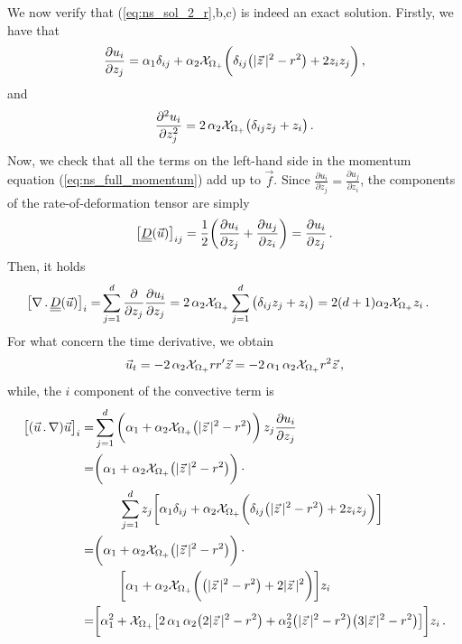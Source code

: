 We now verify that (\ref{eq:ns_sol_2_r},b,c) is indeed an exact solution.
Firstly, we have that
\begin{equation*}
\frac{\partial u_i}{\partial z_j} = \alpha_1 \delta_{ij}
+ \alpha_2\mathrm{\mathcal{X}}_{\Omega_+}\bigg(\delta_{ij}\big(|\vec z\,|^2-r^2\big)
+ 2z_iz_j\bigg)\,,
\end{equation*}
and
\begin{equation*}
\frac{\partial^2 u_i}{\partial z_j^2} =
2 \,\alpha_2\mathrm{\mathcal{X}}_{\Omega_+}\big(\delta_{ij} z_j+ z_i\big)\,.
\end{equation*}
Now, we check that all the terms on the left-hand side in the momentum equation
(\ref{eq:ns_full_momentum}) add up to $\vec f$.  Since $\frac{\partial
u_i}{\partial z_j}=\frac{\partial u_j}{\partial z_i}$, the components of the
rate-of-deformation tensor are simply
\begin{equation*}
\big[\mat D(\vec u) \big]_{ij} = \frac{1}{2}\bigg(\frac{\partial
u_i}{\partial z_j} + \frac{\partial u_j}{\partial z_i}\bigg)=
\frac{\partial u_i}{\partial z_j}\,.
\end{equation*}
Then, it holds
\begin{align*}
\big[\nabla\,.\,\mat D(\vec u)\big]_i = &
\sum_{j=1}^d\frac{\partial}{\partial z_j} \frac{\partial u_i}{\partial z_j}
= 2 \,\alpha_2\charfcn{\Omega_+}\sum_{j=1}^d\big(\delta_{ij} z_j + z_i \big)
= 2(d+1)\alpha_2\charfcn{\Omega_+}z_i\,.
\end{align*}
For what concern the time derivative, we obtain
\begin{align*}
\vec u_t = -2\,\alpha_2\mathrm{\mathcal{X}}_{\Omega_+}rr^\prime\vec z =
-2\,\alpha_1\,\alpha_2\mathrm{\mathcal{X}}_{\Omega_+}r^2\vec z\,,
\end{align*}
while, the $i$ component of the convective term is
\begin{align*}
\big[(\vec u \,.\, \nabla)\vec u\big]_i =&
\sum_{j=1}^d \bigg(\alpha_1+\alpha_2\mathrm{\mathcal{X}}_{\Omega_+}
\big(|\vec z\,|^2-r^2\big)\bigg)\, z_j
\frac{\partial u_i}{\partial z_j} \\
= &\bigg(\alpha_1+\alpha_2\mathrm{\mathcal{X}}_{\Omega_+}
\big(|\vec z\,|^2-r^2\big)\bigg)\,\cdot \\
&\qquad \sum_{j=1}^d z_j\bigg[
\alpha_1 \delta_{ij}
+ \alpha_2\mathrm{\mathcal{X}}_{\Omega_+}\bigg(\delta_{ij}\big(|\vec z\,|^2-r^2\big)
+ 2z_iz_j\bigg)\bigg] \\
= &\bigg(\alpha_1+\alpha_2\mathrm{\mathcal{X}}_{\Omega_+}
\big(|\vec z\,|^2-r^2\big)\bigg)\,\cdot \\
&\qquad \bigg[
\alpha_1 + \alpha_2\mathrm{\mathcal{X}}_{\Omega_+}\bigg(\big(|\vec z\,|^2-r^2\big)
+ 2|\vec z\,|^2\bigg)\bigg]z_i \\
= &\bigg[\alpha_1^2
+ \mathrm{\mathcal{X}}_{\Omega_+}\big[2\,\alpha_1\,\alpha_2\big(2|\vec z\,|^2-r^2\big)
+ \alpha_2^2\big(|\vec z\,|^2-r^2\big)\big(3|\vec z\,|^2
- r^2\big)\big]\bigg] z_i\,.
\end{align*}
